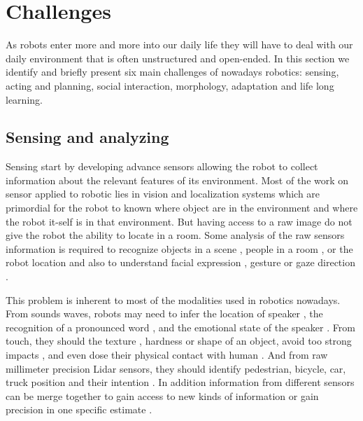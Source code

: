 \section{Challenges}

As robots enter more and more into our daily life they will have to deal with our daily environment that is often unstructured and open-ended. In this section we identify and briefly present six main challenges of nowadays robotics: sensing, acting and planning, social interaction, morphology, adaptation and life long learning.

\subsection{Sensing and analyzing}


Sensing start by developing advance sensors allowing the robot to collect information about the relevant features of its environment. Most of the work on sensor applied to robotic lies in vision and localization systems which are primordial for the robot to known where object are in the environment and where the robot it-self is in that environment. But having access to a raw image do not give the robot the ability to locate in a room. Some analysis of the raw sensors information is required to recognize objects in a scene \cite{filliat2007visual}, people in a room \cite{nakauchi2002social}, or the robot location \cite{durrant2006simultaneous, bailey2006simultaneous} and also to understand facial expression \cite{valstar2006fully}, gesture \cite{nickel2007visual} or gaze direction \cite{matsumoto2000algorithm}.

This problem is inherent to most of the modalities used in robotics nowadays. From sounds waves, robots may need to infer the location of speaker \cite{nakadai2002real,valin2003robust}, the recognition of a pronounced word \cite{rabiner1989tutorial}, and the emotional state of the speaker \cite{oudeyer2003production}. From touch, they should the texture \cite{howe1989sensing,nguyen2011texture}, hardness \cite{shikida2003active} or shape \cite{schneider2009object} of an object, avoid too strong impacts \cite{alami2006safe} , and even dose their physical contact with human \cite{nakagawa2011effect,miyashita2007haptic}. And from raw millimeter precision Lidar sensors, they should identify pedestrian, bicycle, car, truck position and their intention \cite{himmelsbach2008lidar}. In addition information from different sensors can be merge together to gain access to new kinds of information or gain precision in one specific estimate \cite{xiong2002multi}. 

